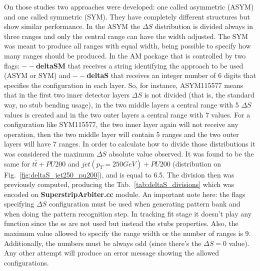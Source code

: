 On those studies two approaches were developed: one called asymmetric (ASYM) and one called symmetric (SYM). They have completely different structures but show similar performance. In the ASYM the $\Delta S$ distribution is divided always in three ranges and only the central range can have the width adjusted. The SYM was meant to produce all ranges with equal width, being possible to specify how many ranges should be produced. In the AM package that is controlled by two flags: \textbf{$--$deltaSM} that receives a string identifying the approach to be used (ASYM or SYM) and \textbf{$--$deltaS} that receives an integer number of 6 digits that specifies the configuration in each layer. So, for instance, ASYM115577 means that in the first two inner detector layers $\Delta S$ is not divided (that is, the standard way, no stub bending usage), in the two middle layers a central range with 5 $\Delta S$ values is created and in the two outer layers a central range with 7 values. For a configuration like SYM115577, the two inner layer again will not receive any operation, then the two middle layer will contain 5 ranges and the two outer layers will have 7 ranges. In order to calculate how to divide those distributions it was considered the maximum $\Delta S$ absolute value observed. It was found to be the same for $t\bar{t}+PU200$ and $jet(p_{T}=250GeV)+PU200$ (distribution on Fig.~\ref{fig:deltaS_jet250_pu200}), and is equal to 6.5. The division then was previously computed, producing the Tab.~\ref{tab:deltaS_divisions} which was encoded on \textbf{SuperstripArbiter.cc} module. An important note here: the flags specifying $\Delta S$ configuration must be used when generating pattern bank and when doing the pattern recognition step. In tracking fit stage it doesn't play any function since the ss are not used but instead the stubs properties. Also, the maximum value allowed to specify the range width or the number of ranges is 9. Additionally, the numbers must be always odd (since there's the $\Delta S = 0$ value). Any other attempt will produce an error message showing the allowed configurations.

